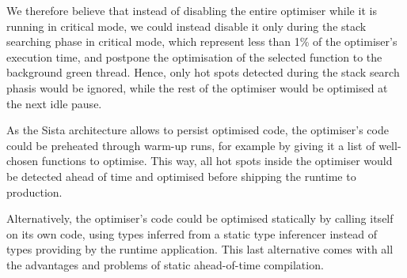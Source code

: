 \documentclass[a4paper,12pt,twoside]{../includes/ThesisStyle}
\begin{document}
We therefore believe that instead of disabling the entire optimiser while it is running in critical mode, we could instead disable it only during the stack searching phase in critical mode, which represent less than 1\% of the optimiser's execution time, and postpone the optimisation of the selected function to the background green thread. Hence, only hot spots detected during the stack search phasis would be ignored, while the rest of the optimiser would be optimised at the next idle pause.

As the Sista architecture allows to persist optimised code, the optimiser's code could be preheated through warm-up runs, for example by giving it a list of well-chosen functions to optimise. This way, all hot spots inside the optimiser would be detected ahead of time and optimised before shipping the runtime to production. 

Alternatively, the optimiser's code could be optimised statically by calling itself on its own code, using types inferred from a static type inferencer instead of types providing by the runtime application. This last alternative comes with all the advantages and problems of static ahead-of-time compilation.




\end{document}
